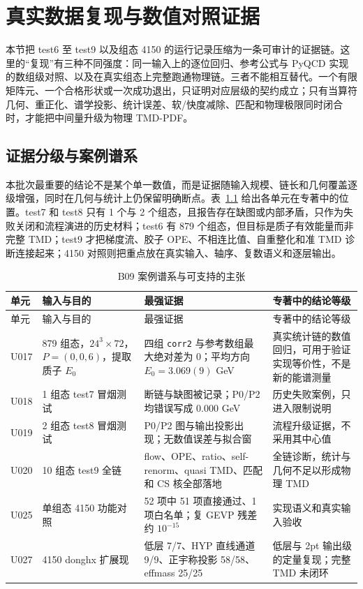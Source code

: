 \chapter{真实数据复现与数值对照证据}
\label{sec:b09-real-data}

本节把 test6 至 test9 以及组态 4150 的运行记录压缩为一条可审计的证据链。这里的“复现”有三种不同强度：同一输入上的逐位回归、参考公式与 PyQCD 实现的数组级对照、以及在真实组态上完整跑通物理链。三者不能相互替代。一个有限矩阵元、一个合格形状或一次成功退出，只证明对应层级的契约成立；只有当算符几何、重正化、谱学投影、统计误差、软/快度减除、匹配和物理极限同时闭合时，才能把中间量升级为物理 TMD-PDF。

\section{证据分级与案例谱系}

本批次最重要的结论不是某个单一数值，而是证据随输入规模、链长和几何覆盖逐级增强，同时在几何与统计上仍保留明确断点。表~\ref{tab:b09-case-lineage} 给出各单元在专著中的位置。test7 和 test8 只有 1 个与 2 个组态，且报告存在缺图或内部矛盾，只作为失败关闭和流程演进的历史材料；test6 有 879 个组态，但目标是质子有效能量而非完整 TMD；test9 才把梯度流、胶子 OPE、不相连比值、自重整化和准 TMD 诊断连接起来；4150 对照则把重点放在真实输入、轴序、复数语义和逐层输出。

\begin{longtable}{@{}p{}p{}p{}p{}@{}}
\caption{B09 案例谱系与可支持的主张}\label{tab:b09-case-lineage}\\
\hline
单元 & 输入与目的 & 最强证据 & 专著中的结论等级 \\
\hline
\endfirsthead
\hline
单元 & 输入与目的 & 最强证据 & 专著中的结论等级 \\
\hline
\endhead
U017 & 879 组态，\(24^3\times72\)，\(P=(0,0,6)\)，提取质子 \(E_0\) & 四组 \texttt{corr2} 与参考数组最大绝对差为 0；平均方向 \(E_0=3.069(9)\) GeV & 真实统计链的数值回归，可用于验证实现等价性，不是新的能谱测量 \\
\hline
U018 & 1 组态 test7 冒烟测试 & 断链与缺图被记录；P0/P2 均错误写成 0.000 GeV & 历史失败案例，只进入限制说明 \\
\hline
U019 & 2 组态 test8 冒烟测试 & P0/P2 图与输出投影出现；无数值误差与拟合窗 & 流程升级证据，不采用其中心值 \\
\hline
U020 & 10 组态 test9 全链 & flow、OPE、ratio、self-renorm、quasi TMD、匹配和 CS 核全部落地 & 全链诊断，统计与几何不足以形成物理 TMD \\
\hline
U025 & 单组态 4150 功能对照 & 52 项中 51 项直接通过、1 项白名单；复 GEVP 残差约 \(10^{-15}\) & 实现语义和真实输入验收 \\
\hline
U027 & 4150 donghx 扩展现 & 低层 7/7、HYP 直线通道 9/9、正宇称投影 58/58、effmass 25/25 & 低层与 2pt 输出级的定量复现；完整 TMD 未闭环 \\
\hline
\bottomrule
\end{longtable}


